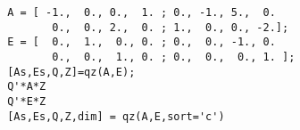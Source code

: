 \begin{examples}
  \begin{Verbatim}
 A = [ -1.,  0., 0.,  1. ; 0., -1., 5.,  0. 
        0.,  0., 2.,  0. ; 1.,  0., 0., -2.];
 E = [  0.,  1.,  0., 0. ; 0.,  0., -1., 0. 
        0.,  0.,  1., 0. ; 0.,  0.,  0., 1. ];
 [As,Es,Q,Z]=qz(A,E);
 Q'*A*Z 
 Q'*E*Z 
 [As,Es,Q,Z,dim] = qz(A,E,sort='c')
  \end{Verbatim}
\end{examples}
\begin{manseealso}
    
\end{manseealso}
